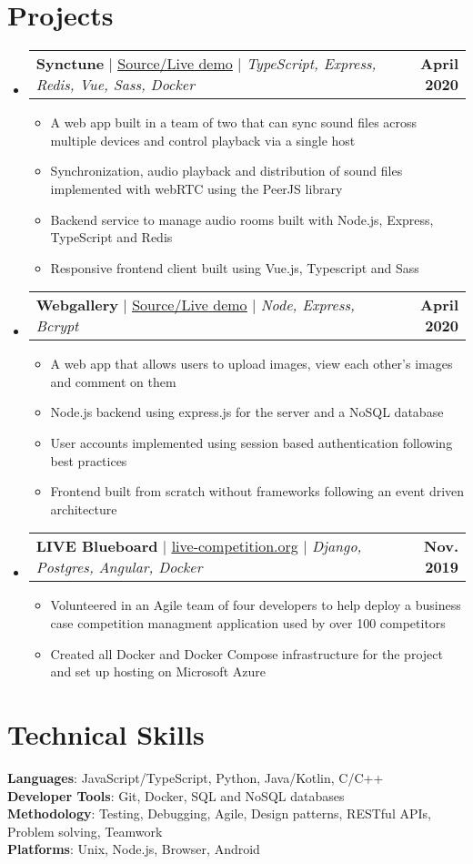 \documentclass[letterpaper,11pt]{article}
\makeatletter
\newcommand{\resumeItem}[1]{
  \item\small{
    {#1 \vspace{-2pt}}
  }
}
\newcommand{\resumeProjectHeading}[2]{
    \item
    \begin{tabular*}{1.001\textwidth}{l@{\extracolsep{\fill}}r}
      \small#1 & \textbf{\small #2}\\
    \end{tabular*}\vspace{-7pt}
}
\newcommand{\resumeSubHeadingListStart}{\begin{itemize}[leftmargin=0.0in, label={}]}
\newcommand{\resumeSubHeadingListEnd}{\end{itemize}}
\newcommand{\resumeItemListStart}{\begin{itemize}}
\newcommand{\resumeItemListEnd}{\end{itemize}\vspace{-5pt}}
\makeatother
\begin{document}
\section{Projects}
    \vspace{-15pt}
    \resumeSubHeadingListStart
      \resumeProjectHeading
          {\textbf{Synctune} $|$ \href{https://github.com/synctune/synctune}{\underline{Source/Live demo}} $|$ \emph{TypeScript, Express, Redis, Vue, Sass, Docker}}{April 2020}
          \resumeItemListStart
            \resumeItem{A web app built in a team of two that can sync sound files across multiple devices and control playback via a single host}
            \resumeItem{Synchronization, audio playback and distribution of sound files implemented with webRTC using the PeerJS library}
            \resumeItem{Backend service to manage audio rooms built with Node.js, Express, TypeScript and Redis}
            \resumeItem{Responsive frontend client built using Vue.js, Typescript and Sass}
          \resumeItemListEnd
      \resumeProjectHeading
          {\textbf{Webgallery} $|$ \href{https://github.com/nakamin/webgallery}{\underline{Source/Live demo}} $|$ \emph{Node, Express, Bcrypt}}{April 2020}
          \resumeItemListStart
            \resumeItem{A web app that allows users to upload images, view each other's images and comment on them}
            \resumeItem{Node.js backend using express.js for the server and a NoSQL database}
            \resumeItem{User accounts implemented using session based authentication following best practices}
            \resumeItem{Frontend built from scratch without frameworks following an event driven architecture}
          \resumeItemListEnd
      \resumeProjectHeading
          {\textbf{LIVE Blueboard} $|$ \href{https://www.live-competition.org/}{\underline{live-competition.org}} $|$ \emph{Django, Postgres, Angular, Docker}}{Nov. 2019}
          \resumeItemListStart
            \resumeItem{Volunteered in an Agile team of four developers to help deploy a business case competition managment application used by over 100 competitors}
            \resumeItem{Created all Docker and Docker Compose infrastructure for the project and set up hosting on Microsoft Azure}
          \resumeItemListEnd
    \resumeSubHeadingListEnd
\vspace{-15pt}


\section{Technical Skills}
 \begin{itemize}[leftmargin=0.15in, label={}]
    \small{\item{
     \textbf{Languages}{: JavaScript/TypeScript, Python, Java/Kotlin, C/C++} \\
     \textbf{Developer Tools}{: Git, Docker, SQL and NoSQL databases} \\
     \textbf{Methodology}{: Testing, Debugging, Agile, Design patterns, RESTful APIs, Problem solving, Teamwork} \\
     \textbf{Platforms}{: Unix, Node.js, Browser, Android} \\
    }}
 \end{itemize}
 \vspace{-16pt}
\end{document}
